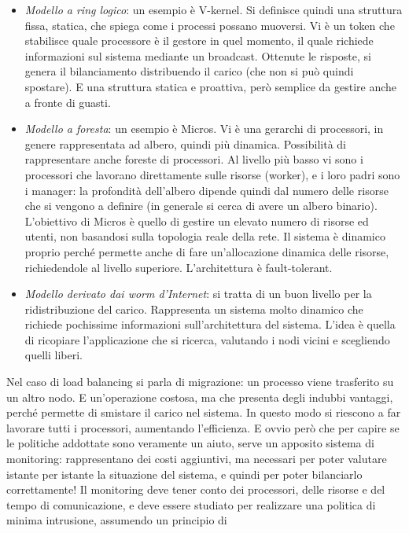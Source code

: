 \begin{itemize}
 \item \textit{Modello a ring logico}: un esempio è V-kernel. Si definisce quindi una struttura fissa, statica, che 
 spiega come i processi possano muoversi. Vi è un token che stabilisce quale processore è il gestore in quel momento, il
 quale richiede informazioni sul sistema mediante un broadcast. Ottenute le risposte, si genera il bilanciamento 
 distribuendo il carico (che non si può quindi spostare). E una struttura statica e proattiva, però semplice da gestire 
 anche a fronte di guasti.
 \item \textit{Modello a foresta}: un esempio è Micros. Vi è una gerarchi di processori, in genere rappresentata ad 
 albero, quindi più dinamica. Possibilità di rappresentare anche foreste di processori. Al livello più basso vi sono i 
 processori che lavorano direttamente sulle risorse (worker), e i loro padri sono i manager: la profondità dell'albero 
 dipende quindi dal numero delle risorse che si vengono a definire (in generale si cerca di avere un albero binario). 
 L'obiettivo di Micros è quello di gestire un elevato numero di risorse ed utenti, non basandosi sulla topologia reale 
 della rete. Il sistema è dinamico proprio perché permette anche di fare un'allocazione dinamica delle risorse,
 richiedendole al livello superiore. L'architettura è fault-tolerant.
 \item \textit{Modello derivato dai worm d'Internet}: si tratta di un buon livello per la ridistribuzione del carico. 
Rappresenta  un sistema molto dinamico che richiede pochissime informazioni sull'architettura del sistema. L'idea è 
quella di  ricopiare l'applicazione che si ricerca, valutando i nodi vicini e scegliendo quelli liberi.
\end{itemize}
Nel caso di load balancing si parla di migrazione: un processo viene trasferito su un altro nodo. E un'operazione 
costosa, ma che presenta degli indubbi vantaggi, perché permette di smistare il carico nel sistema. In questo modo si 
riescono a far lavorare tutti i processori, aumentando l'efficienza.
E ovvio però che per capire se le politiche addottate sono veramente un aiuto, serve un apposito sistema di monitoring: 
rappresentano dei costi aggiuntivi, ma necessari per poter valutare istante per istante la situazione del sistema, e
quindi per poter bilanciarlo correttamente! Il monitoring deve tener conto dei processori, delle risorse e del tempo di 
comunicazione, e deve essere studiato per realizzare una politica di minima intrusione, assumendo un principio di 
